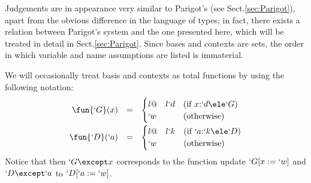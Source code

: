 \documentclass{CSML}
\begin{document}
Judgements are in appearance very similar to Parigot's (see Sect.\skp\ref{sec:Parigot}), apart from the obvious difference in the language of types; in fact, there exists a relation between Parigot's system and the one presented here, which will be treated in detail in Sect.\skp\ref{sec:Parigot}.
Since bases and contexts are sets, the order in which variable and name assumptions are listed is immaterial.

We will occasionally treat basis and contexts as total functions by using the following notation:
%
 \[ \begin{array}{rcl}
 \fun{`G}(x) &=& 
 \begin{cases}{l@{\quad}l}
	`d & (\textrm{if }x{:}`d \ele `G) \\
	`w & (\textrm{otherwise})
 \end{cases}
\\ [4mm]
 \fun{`D }(`a) &=& 
 \begin{cases}{l@{\quad}l}
	`k & (\textrm{if }`a{:}`k \ele `D) \\
	`w & (\textrm{otherwise})
 \end{cases}
 \end{array} \]
Notice that then $`G \except x $ corresponds to the function update $`G[x:= `w]$ and $`D \except `a$ to $`D[`a:= `w]$.
\end{document}
